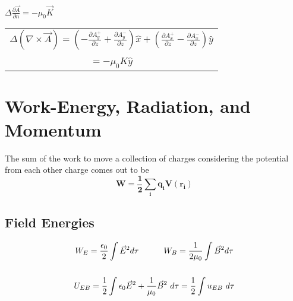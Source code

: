 \documentclass[12pt]{article}
\begin{document}
\begin{minipage}[t]{.55\textwidth}
	\hfill \break \\ 
	\( \boxed{ \Delta \frac{\partial \vec{A}}{\partial n} = -\mu_0 \vec{K} } \) \ \ \ 
	\begin{tabular}{|m{1.5cm} c c}
		\multicolumn{3}{|c}{
			\( \displaystyle \Delta ( \nabla \times \vec{A} )
			= \left( - \frac{\partial A_y^+}{\partial z} + \frac{\partial A_y^-}{\partial z} \right) \hat{x}
			+ \left( \frac{\partial A_x^+}{\partial z} - \frac{\partial A_x^-}{\partial z} \right) \hat{y} \)
		} \\ \\
		 & \( = -\mu_0 K \hat{y} \) & 
	\end{tabular}
\end{minipage}

\newpage
\section{Work-Energy, Radiation, and Momentum}
The sum of the work to move a collection of charges considering the potential from each other charge 
comes out to be
\[ \boldsymbol{ W = \frac{1}{2} \sum_i q_i V(r_i) } \]

\subsection{Field Energies}
\vspace{-10pt}
\begin{gather*}
	W_E = \frac{\epsilon_0}{2} \int \vec{E}^2 d\tau 
	\indent \indent W_B = \frac{1}{2\mu_0} \int \vec{B}^2 d\tau\\ \\
	U_{EB} = \frac{1}{2} \int \epsilon_0 \vec{E}^2 + \frac{1}{\mu_0} \vec{B}^2 \ d\tau 
		= \frac{1}{2} \int u_{EB} \ d\tau
\end{gather*}
\end{document}
